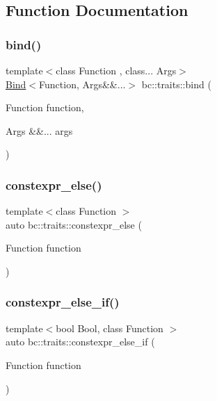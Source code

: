 \subsection{Function Documentation}
\mbox{\label{namespacebc_1_1traits_aec399a77e3255fad556ea6ed08f792d0}} 
\subsubsection{\texorpdfstring{bind()}{bind()}}
{\footnotesize\ttfamily template$<$class Function , class... Args$>$ \\
\hyperlink{structbc_1_1traits_1_1Bind}{Bind}$<$Function, Args\&\&...$>$ bc\+::traits\+::bind (\begin{DoxyParamCaption}\item[{Function}]{function,  }\item[{Args \&\&...}]{args }\end{DoxyParamCaption})}

\mbox{\label{namespacebc_1_1traits_a30bcb0bd6da49472c9289e6ee043c827}} 
\subsubsection{\texorpdfstring{constexpr\+\_\+else()}{constexpr\_else()}}
{\footnotesize\ttfamily template$<$class Function $>$ \\
auto bc\+::traits\+::constexpr\+\_\+else (\begin{DoxyParamCaption}\item[{Function}]{function }\end{DoxyParamCaption})}

\mbox{\label{namespacebc_1_1traits_a187b6bbba1f4f1c91daf80ae5e4f9813}} 
\subsubsection{\texorpdfstring{constexpr\+\_\+else\+\_\+if()}{constexpr\_else\_if()}\hspace{0.1cm}{\footnotesize\ttfamily [1/2]}}
{\footnotesize\ttfamily template$<$bool Bool, class Function $>$ \\
auto bc\+::traits\+::constexpr\+\_\+else\+\_\+if (\begin{DoxyParamCaption}\item[{Function}]{function }\end{DoxyParamCaption})}


